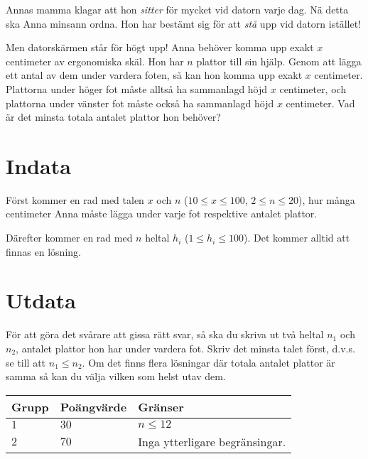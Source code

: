 Annas mamma klagar att hon \emph{sitter} för mycket vid datorn varje
dag. Nä detta ska Anna minsann ordna. Hon har bestämt sig för att
\emph{stå} upp vid datorn istället!

Men datorskärmen står för högt upp! Anna behöver komma upp exakt
$x$ centimeter av ergonomiska skäl. Hon har $n$ plattor till sin
hjälp. Genom att lägga
ett antal av dem under vardera foten, så kan hon komma upp exakt $x$ centimeter.
Plattorna under höger fot måste alltså ha sammanlagd höjd $x$ centimeter, och plattorna under vänster fot måste
också ha sammanlagd höjd $x$ centimeter. Vad är det minsta totala antalet plattor hon behöver?

\section*{Indata}

Först kommer en rad med talen $x$ och $n$ ($10 \leq x \leq 100$, $2 \leq n \leq
20$), hur många centimeter Anna måste lägga under varje fot respektive
antalet plattor.

Därefter kommer en rad med $n$ heltal $h_i$ ($1 \leq h_i \leq 100$). Det kommer alltid att
finnas en lösning.

\section*{Utdata}
För att göra det svårare att gissa rätt svar, så ska du skriva ut två heltal $n_1$ och $n_2$,
antalet plattor hon har under vardera fot. Skriv det minsta talet först, d.v.s. se till att $n_1\leq n_2$.
Om det finns flera lösningar där totala antalet plattor är samma så kan du välja vilken som helst utav dem.

\noindent
\begin{tabular}{| l | l | p{12cm} |}
  \hline
  Grupp & Poängvärde & Gränser \\ \hline
  $1$    & $30$        & $n \leq 12$ \\ \hline 
  $2$    & $70$        & Inga ytterligare begränsingar. \\ \hline 
\end{tabular}
